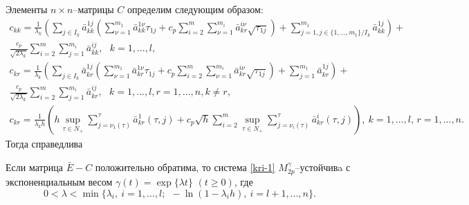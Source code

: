 Элементы $n\times n$--матрицы $C$ определим следующим образом:
$$
\begin{array}{crl}
c_{kk}  = \frac{1}{\lambda _k }\left(\sum \limits_{j \in I_k}\bar
a^{1j}_{kk}\left(\sum \limits_{\nu=1}^{m_1}\bar a^{1\nu}_{kk}\tau
_{1j}  + c_p\sum \limits_{i=2}^m \sum \limits_{\nu=1}^{m_i}\bar
a^{i\nu}_{kr}\sqrt{\tau _{1j}}\right ) + \sum \limits_{j=1, j \in
\{1,...,m_1\}/ I_k}^{m_1} \bar a^{1j}_{kk}\right )+ \\
\frac{c_p}{\sqrt{2\lambda_k }}\sum
\limits_{i=2}^m \sum \limits_{j=1}^{m_i}\bar a^{ij}_{kk}, \ \ \ k = 1,...,l,\\
c_{kr} = \frac{1}{\lambda _k }\left(\sum \limits_{j \in I_k}\bar
a^{1j}_{kr}\left(\sum \limits_{\nu=1}^{m_1}\bar a^{1\nu}_{kr} \tau
_{1j} +  c_p\sum \limits_{i=2}^m \sum \limits_{\nu=1}^{m_i}\bar
a^{i\nu}_{kr}\sqrt{\tau _{1j}}\right ) + \sum \limits_{j=1}^{m_1}
\bar a^{1j}_{kr}\right )+ \\
\frac{c_p}{\sqrt{2\lambda_k }}\sum \limits_{i=2}^m \sum
\limits_{j=1}^{m_i}\bar a^{ij}_{kr}, \ \ \ k =
1,...,l,r = 1, ..., n, k \neq r,\\
 c_{kr} = \frac{1}{\lambda_kh}
\left(h\mathrel {\mathop {\sup} \limits _{\tau \in N_+}}\sum \limits
_{j=\nu _1 (\tau)}^{\tau}\bar a^{1}_{kr}(\tau,j) + c_p\sqrt{h}\sum
\limits _{i=2}^{m}\mathrel {\mathop {\sup} \limits _{\tau \in
N_+}}\sum \limits _{j=\nu _i (\tau)}^{\tau}\bar
a^{i}_{kr}(\tau,j)\right), \ k\! =\! 1,...,l,\, r \! =\! 1,...,n.
\end {array}
$$
Тогда справедлива

\begin{theorem}\label{kri-th5}
Если матрица $\bar E - C$ положительно
обратима, то система \eqref{kri-1} $M_{2p}^\gamma $--устой\-чивa с
экспоненциальным весом $\gamma (t) = \exp \{\lambda t\} \,\, (t \geq
0)$, где \begin{equation}\label{kri-9}0<\lambda < \min \{\lambda _i, \ i = 1, ...,l; \ \ -\ln
(1-\lambda _ih), \ i = l+1, ..., n \}.
\end{equation}
\end{theorem}

